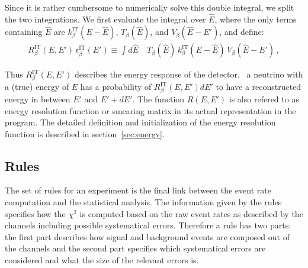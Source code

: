 Since it is rather cumbersome to numerically solve this double integral,
we split the two integrations. We first evaluate the integral over
$\hat{E}$, where the only terms containing $\hat{E}$ are
$k_\beta^{\text{IT}}(E-\hat{E})$,  $ T_\beta(\hat{E})$, and 
$ V_\beta(\hat{E}-E')$, and define:
\begin{eqnarray}
\label{eq:e_res} 
R_\beta^{\text{IT}}(E,E')\,\epsilon_\beta^{\text{IT}}(E')
 \equiv
\int d\hat{E} \quad T_\beta(\hat{E})\,k_\beta^{\text{IT}}(E-\hat{E})
\,V_\beta(\hat{E}-E')\,, 
\end{eqnarray}


Thus $R_\beta^{\text{IT}}(E,E')$ describes the energy response of 
the detector, \ie\ a neutrino with a (true) energy of $E$ has a probability
of $R_\beta^{\text{IT}}(E,E') dE'$ to have a reconstructed energy 
in between $E'$ and $E'+dE'$. The function $R(E,E')$ is also refered to
as energy resolution function or smearing matrix in its actual representation
in the program. The detailed
definition and initialization of the energy resolution function is described
in section~\ref{sec:energy}.


\subsection{Rules}
\label{sec:rules}

The set of rules for an experiment is the final 
link between the event rate
computation and the statistical analysis. The information given by the rules
specifies how the $\chi^2$ is computed based on the raw event rates as 
described by the channels including possible systematical errors. 
Therefore a rule has two parts: the first part describes how signal and 
background events are composed out of the channels and the second part
specifies which systematical errors are considered and what the size
of the relevant errors is.

